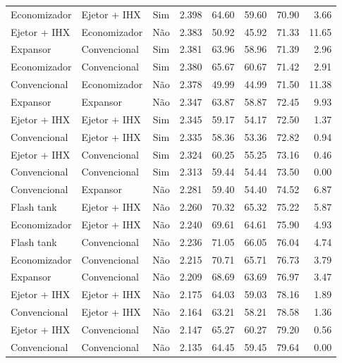 {\begin{tabular}{llcrrrrr}
Economizador & Ejetor + IHX & Sim & 2.398 & 64.60 & 59.60 & 70.90 & 3.66 \\
Ejetor + IHX & Economizador & Não & 2.383 & 50.92 & 45.92 & 71.33 & 11.65 \\
Expansor & Convencional & Sim & 2.381 & 63.96 & 58.96 & 71.39 & 2.96 \\
Economizador & Convencional & Sim & 2.380 & 65.67 & 60.67 & 71.42 & 2.91 \\
Convencional & Economizador & Não & 2.378 & 49.99 & 44.99 & 71.50 & 11.38 \\
Expansor & Expansor & Não & 2.347 & 63.87 & 58.87 & 72.45 & 9.93 \\
Ejetor + IHX & Ejetor + IHX & Sim & 2.345 & 59.17 & 54.17 & 72.50 & 1.37 \\
Convencional & Ejetor + IHX & Sim & 2.335 & 58.36 & 53.36 & 72.82 & 0.94 \\
Ejetor + IHX & Convencional & Sim & 2.324 & 60.25 & 55.25 & 73.16 & 0.46 \\
Convencional & Convencional & Sim & 2.313 & 59.44 & 54.44 & 73.50 & 0.00 \\
Convencional & Expansor & Não & 2.281 & 59.40 & 54.40 & 74.52 & 6.87 \\
Flash tank & Ejetor + IHX & Não & 2.260 & 70.32 & 65.32 & 75.22 & 5.87 \\
Economizador & Ejetor + IHX & Não & 2.240 & 69.61 & 64.61 & 75.90 & 4.93 \\
Flash tank & Convencional & Não & 2.236 & 71.05 & 66.05 & 76.04 & 4.74 \\
Economizador & Convencional & Não & 2.215 & 70.71 & 65.71 & 76.73 & 3.79 \\
Expansor & Convencional & Não & 2.209 & 68.69 & 63.69 & 76.97 & 3.47 \\
Ejetor + IHX & Ejetor + IHX & Não & 2.175 & 64.03 & 59.03 & 78.16 & 1.89 \\
Convencional & Ejetor + IHX & Não & 2.164 & 63.21 & 58.21 & 78.58 & 1.36 \\
Ejetor + IHX & Convencional & Não & 2.147 & 65.27 & 60.27 & 79.20 & 0.56 \\
Convencional & Convencional & Não & 2.135 & 64.45 & 59.45 & 79.64 & 0.00 \\
\bottomrule
\end{tabular}
}
